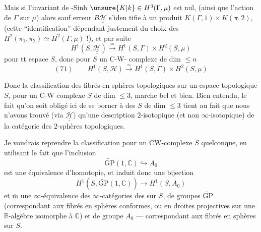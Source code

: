 Mais si l'invariant de -Sinh
$\unsure{K|k}\in H^3(\Gamma,\mu)$ est nul,
 (ainsi que l'action
de $\Gamma$ sur $\mu$) alors sauf erreur
$B\underline{\underline{\mathcal H}}$ s'iden%
tifie à un produit $K(\Gamma,1)\times K(\pi,2)$,
(cette ``identification'' dépendant justement du
choix des $H^2(\pi_1,\pi_2)\simeq H^2(\Gamma,\mu)$ !), et par
suite
\[
H^1(S,\underline{\underline{\mathcal H}})\xrightarrow{\simeq}
H^1(S,\Gamma)\times H^2(S,\mu)
\]
pour tt espace $S$, donc pour $S$ un C-W-%
complexe de dim $\leq n$
\[
(71)\qquad
H^1(S,\mathcal H)\xrightarrow{\simeq}H^1(S,\Gamma)\times H^2(S,\mu)
\]

Donc la classification des fibrés en sphères
topologiques sur un espace topologique $S$,
pour un C-W complexe $S$ de dim $\leq3$,
marche bel et bien. Bien entendu, le
fait qu'on soit obligé ici de se borner à
des  $S$ de dim $\leq3$ tient au fait
que nous n'avons trouvé 
(via $\underline{\underline{\mathcal H}}$)
qu'une description $2$-isotopique (et non
$\infty$-isotopique) de la catégorie des $2$-sphères
topologiques.

Je voudrais reprendre la classification
pour un CW-complexe $S$ quelconque, en
utilisant le fait que l'inclusion
\[
\widetilde{\mathrm{GP}}(1,\mathbb C)\hookrightarrow A_0
\]
est une équivalence d'homotopie, et induit
donc une bijection
\[
H^1(S,\widetilde{\mathrm{GP}}(1,\mathbb C))\longrightarrow H^1(S,A_0)
\]
et $\overline{\mathrm m}$ une $\infty$-équivalence des $\infty$-catégories des
  sur $S$, de  groupes
$\widetilde{\mathrm{GP}}$ (correspondant
aux fibrés en sphères conformes, ou en
droites projectives sur une  $\mathbb R$-algèbre
isomorphe à $\mathbb C$) et de groupe $A_0$ --- correspondant
aux fibrés en sphères sur $S$.

